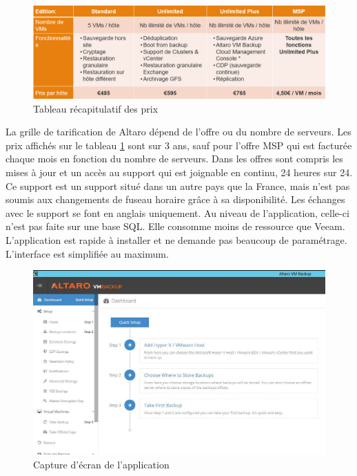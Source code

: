 \documentclass[pfe]{tnreport} %
\begin{document}
\begin{figure}[ht]
 \centering
 \includegraphics[width=15cm]{figures/price.png}
 \caption{Tableau récapitulatif des prix}
 \label{fig:altaro_price}
\end{figure}
La grille de tarification de Altaro dépend de l'offre ou du nombre de serveurs. \newline
Les prix affichés sur le tableau \ref{fig:altaro_price} sont sur 3 ans, sauf pour l'offre MSP qui est facturée chaque mois en fonction du nombre de serveurs. \newline
Dans les offres sont compris les mises à jour et un accès au support qui est joignable en continu, 24 heures sur 24. Ce support est un support situé dans un autre pays que la France, mais n'est pas soumis aux changements de fuseau horaire grâce à sa disponibilité. Les échanges avec le support se font en anglais uniquement. \newline 
Au niveau de l'application, celle-ci n'est pas faite sur une base SQL. \newline 
Elle consomme moins de ressource que Veeam. \newpage
L'application est rapide à installer et ne demande pas beaucoup de paramétrage. L'interface est simplifiée au maximum.\newline
\begin{figure}[ht]
 \centering
 \includegraphics[width=15cm]{figures/Configure-Altaro-VM-backup-for-VMware-1.jpg}
 \caption{Capture d'écran de l'application}
 \label{fig:altaro_install}
\end{figure}
\end{document}
